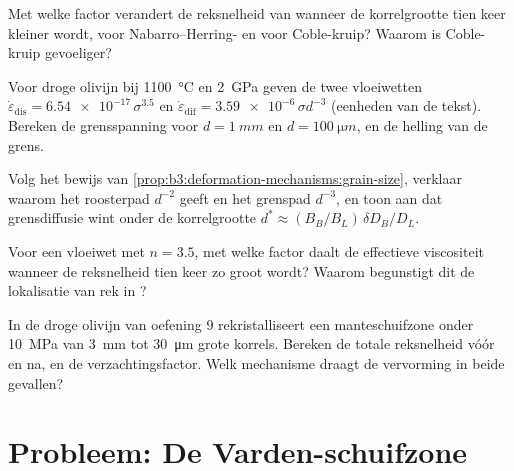 \begin{exercise}[$\star\star$]\label{exo:b3:deformation-mechanisms:8}
Met welke factor verandert de reksnelheid van  wanneer de
korrelgrootte tien keer kleiner wordt, voor Nabarro--Herring- en voor
Coble-kruip? Waarom is Coble-kruip gevoeliger?
\end{exercise}

\begin{exercise}[$\star\star$]\label{exo:b3:deformation-mechanisms:9}
Voor droge olivijn bij \qty{1100}{\celsius} en \qty{2}{GPa} geven de twee vloeiwetten
$\dot\varepsilon_{\mathrm{dis}} = \num{6.54e-17}\,\sigma^{3.5}$ en
$\dot\varepsilon_{\mathrm{dif}} = \num{3.59e-6}\,\sigma d^{-3}$ (eenheden van de
tekst). Bereken de grensspanning voor $d = \qty{1}{mm}$ en $d =
\qty{100}{\micro m}$, en de helling van de grens.
\end{exercise}

\begin{exercise}[$\star\star\star$]\label{exo:b3:deformation-mechanisms:10}
Volg het bewijs van \cref{prop:b3:deformation-mechanisms:grain-size},
verklaar waarom het roosterpad $d^{-2}$ geeft en het grenspad $d^{-3}$, en toon aan
dat grensdiffusie wint onder de korrelgrootte $d^* \approx
(B_B/B_L)\,\delta D_B/D_L$.
\end{exercise}

\begin{exercise}[$\star\star\star$]\label{exo:b3:deformation-mechanisms:11}
Voor een vloeiwet met $n = 3.5$, met welke factor daalt de effectieve
viscositeit wanneer de reksnelheid tien keer zo groot wordt? Waarom begunstigt dit
de lokalisatie van rek in ?
\end{exercise}

\begin{exercise}[$\star\star\star$]\label{exo:b3:deformation-mechanisms:12}
In de droge olivijn van oefening 9 rekristalliseert een manteschuifzone onder \qty{10}{MPa}
van \qty{3}{mm} tot \qty{30}{\micro m} grote korrels. Bereken de totale reksnelheid
vóór en na, en de verzachtingsfactor. Welk mechanisme draagt de vervorming
in beide gevallen?
\end{exercise}

\section{Probleem: De Varden-schuifzone}

